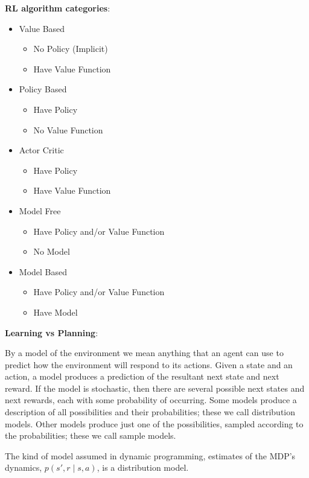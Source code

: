 \documentclass{article}
\begin{document}
\textbf{RL algorithm categories}:

\begin{itemize}
    \item Value Based
    \begin{itemize}
        \item No Policy (Implicit)
        \item Have Value Function
    \end{itemize}
    \item Policy Based
    \begin{itemize}
        \item Have Policy
        \item No Value Function
    \end{itemize}
    \item Actor Critic
    \begin{itemize}
        \item Have Policy
        \item Have Value Function
    \end{itemize}
    \item Model Free
    \begin{itemize}
        \item Have Policy and/or Value Function
        \item No Model
    \end{itemize}
    \item Model Based
    \begin{itemize}
        \item Have Policy and/or Value Function
        \item Have Model
    \end{itemize}
\end{itemize}

\textbf{Learning vs Planning}:

By a model of the environment we mean anything that an agent can use to predict how the
environment will respond to its actions. Given a state and an action, a model produces a
prediction of the resultant next state and next reward. If the model is stochastic, then
there are several possible next states and next rewards, each with some probability of
occurring. Some models produce a description of all possibilities and their probabilities;
these we call distribution models. Other models produce just one of the possibilities,
sampled according to the probabilities; these we call sample models.

The kind of model assumed in dynamic programming, estimates of the MDP's dynamics, \(p(s', r \mid s, a)\), is a distribution
model.
\end{document}

